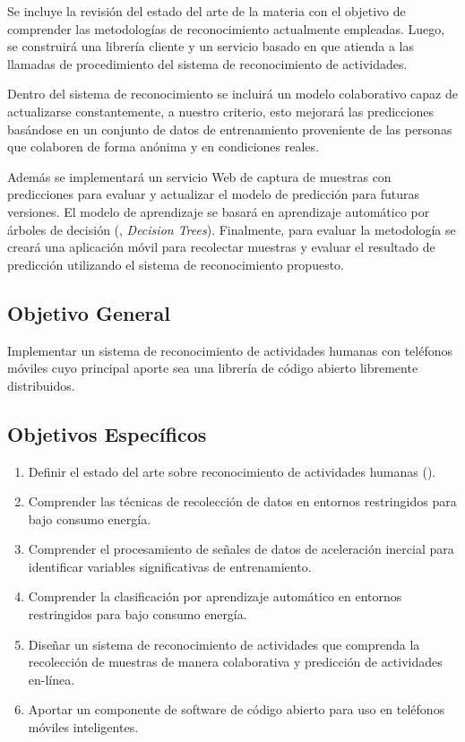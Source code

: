 Se incluye la revisión del estado del arte de la materia con el objetivo
de comprender las metodologías de reconocimiento actualmente empleadas.
Luego, se construirá una librería cliente y un servicio basado en
\emph{} que atienda a las llamadas de procedimiento
del sistema de reconocimiento de actividades. 

Dentro del sistema de reconocimiento se incluirá un modelo colaborativo
capaz de actualizarse constantemente, a nuestro criterio, esto mejorará
las predicciones basándose en un conjunto de datos de entrenamiento
proveniente de las personas que colaboren de forma anónima y en condiciones
reales.

Además se implementará un servicio Web de captura de muestras con
predicciones para evaluar y actualizar el modelo de predicción para
futuras versiones. El modelo de aprendizaje se basará en aprendizaje
automático por árboles de decisión (, \emph{Decision Trees}).
Finalmente, para evaluar la metodología se creará una aplicación móvil
para recolectar muestras y evaluar el resultado de predicción utilizando
el sistema de reconocimiento propuesto.

\subsection{Objetivo General}

\label{objetivo-general}

Implementar un sistema de reconocimiento de actividades humanas con
teléfonos móviles cuyo principal aporte sea una librería de código
abierto libremente distribuidos.

\subsection{Objetivos Específicos}

\label{objetivos-especuxedficos}
\begin{enumerate}
\item \label{enu:obe1}Definir el estado del arte sobre reconocimiento de
actividades humanas (). 
\item \label{enu:obe2}Comprender las técnicas de recolección de datos en
entornos restringidos para bajo consumo energía. 
\item \label{enu:obe3}Comprender el procesamiento de señales de datos de
aceleración inercial para identificar variables significativas de
entrenamiento. 
\item \label{enu:obe4}Comprender la clasificación por aprendizaje automático
en entornos restringidos para bajo consumo energía. 
\item \label{enu:obe5}Diseñar un sistema de reconocimiento de actividades
que comprenda la recolección de muestras de manera colaborativa y
predicción de actividades en-línea. 
\item \label{enu:obe6}Aportar un componente de software de código abierto
para uso en teléfonos móviles inteligentes. 
\end{enumerate}

